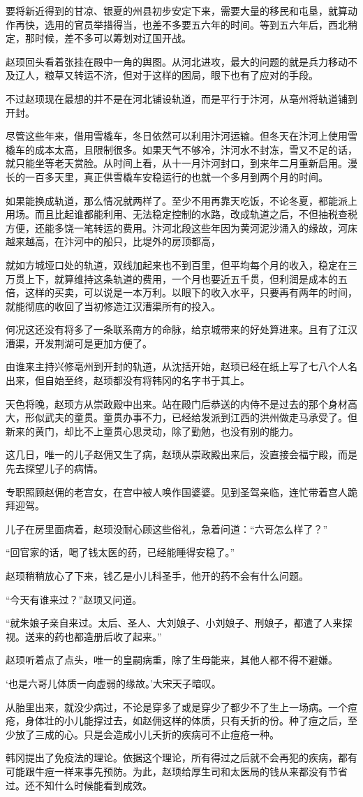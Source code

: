 要将新近得到的甘凉、银夏的州县初步安定下来，需要大量的移民和屯垦，就算动作再快，选用的官员举措得当，也差不多要五六年的时间。等到五六年后，西北稍定，那时候，差不多可以筹划对辽国开战。

赵顼回头看着张挂在殿中一角的舆图。从河北进攻，最大的问题的就是兵力移动不及辽人，粮草又转运不济，但对于这样的困局，眼下也有了应对的手段。

不过赵顼现在最想的并不是在河北铺设轨道，而是平行于汴河，从亳州将轨道铺到开封。

尽管这些年来，借用雪橇车，冬日依然可以利用汴河运输。但冬天在汴河上使用雪橇车的成本太高，且限制很多。如果天气不够冷，汴河水不封冻，雪又不足的话，就只能坐等老天赏脸。从时间上看，从十一月汴河封口，到来年二月重新启用。漫长的一百多天里，真正供雪橇车安稳运行的也就一个多月到两个月的时间。

如果能换成轨道，那么情况就两样了。至少不用再靠天吃饭，不论冬夏，都能派上用场。而且比起谁都能利用、无法稳定控制的水路，改成轨道之后，不但抽税查税方便，还能多饶一笔转运的费用。汴河北段这些年因为黄河泥沙涌入的缘故，河床越来越高，在汴河中的船只，比堤外的房顶都高，

就如方城垭口处的轨道，双线加起来也不到百里，但平均每个月的收入，稳定在三万贯上下，就算维持这条轨道的费用，一个月也要近五千贯，但利润是成本的五倍，这样的买卖，可以说是一本万利。以眼下的收入水平，只要再有两年的时间，就能彻底的收回了当初修造江汉漕渠所有的投入。

何况这还没有将多了一条联系南方的命脉，给京城带来的好处算进来。且有了江汉漕渠，开发荆湖可是更加方便了。

由谁来主持兴修亳州到开封的轨道，从沈括开始，赵顼已经在纸上写了七八个人名出来，但自始至终，赵顼都没有将韩冈的名字书于其上。

天色将晚，赵顼方从崇政殿中出来。站在殿门后恭送的内侍不是过去的那个身材高大，形似武夫的童贯。童贯办事不力，已经给发派到江西的洪州做走马承受了。但新来的黄门，却比不上童贯心思灵动，除了勤勉，也没有别的能力。

这几日，唯一的儿子赵佣又生了病，赵顼从崇政殿出来后，没直接会福宁殿，而是先去探望儿子的病情。

专职照顾赵佣的老宫女，在宫中被人唤作国婆婆。见到圣驾亲临，连忙带着宫人跪拜迎驾。

儿子在房里面病着，赵顼没耐心顾这些俗礼，急着问道：“六哥怎么样了？”

“回官家的话，喝了钱太医的药，已经能睡得安稳了。”

赵顼稍稍放心了下来，钱乙是小儿科圣手，他开的药不会有什么问题。

“今天有谁来过？”赵顼又问道。

“就朱娘子亲自来过。太后、圣人、大刘娘子、小刘娘子、刑娘子，都遣了人来探视。送来的药也都造册后收了起来。”

赵顼听着点了点头，唯一的皇嗣病重，除了生母能来，其他人都不得不避嫌。

‘也是六哥儿体质一向虚弱的缘故。’大宋天子暗叹。

从胎里出来，就没少病过，不论是穿多了或是穿少了都少不了生上一场病。一个痘疮，身体壮的小儿能撑过去，如赵佣这样的体质，只有夭折的份。种了痘之后，至少放了三成的心。只是会造成小儿夭折的疾病可不止痘疮一种。

韩冈提出了免疫法的理论。依据这个理论，所有得过之后就不会再犯的疾病，都有可能跟牛痘一样来事先预防。为此，赵顼给厚生司和太医局的钱从来都没有节省过。还不知什么时候能看到成效。
